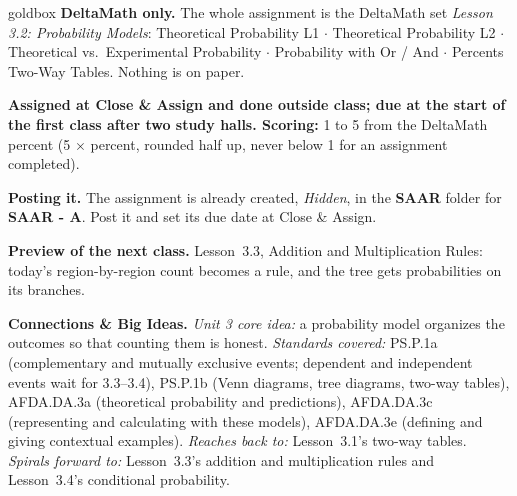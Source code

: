 \documentclass[10pt]{article}
\begin{document}
\boxguard
\begin{skillbox}{goldbox}
\textbf{DeltaMath only.} The whole assignment is the DeltaMath set \emph{Lesson 3.2: Probability
Models}: Theoretical Probability L1 $\cdot$ Theoretical Probability L2 $\cdot$ Theoretical vs.\
Experimental Probability $\cdot$ Probability with Or / And $\cdot$ Percents Two-Way Tables.
Nothing is on paper.

\textbf{Assigned at Close \& Assign and done outside class; due at the start of the first class
after two study halls. Scoring:} 1 to 5 from the DeltaMath percent (5 $\times$ percent, rounded
half up, never below 1 for an assignment completed).

\textbf{Posting it.} The assignment is already created, \emph{Hidden}, in the \textbf{SAAR}
folder for \textbf{SAAR - A}. Post it and set its due date at Close \& Assign.

\textbf{Preview of the next class.} Lesson~3.3, Addition and Multiplication Rules: today's
region-by-region count becomes a rule, and the tree gets probabilities on its branches.

\textbf{Connections \& Big Ideas.} \textit{Unit 3 core idea:} a probability model organizes the
outcomes so that counting them is honest. \textit{Standards covered:} PS.P.1a (complementary and
mutually exclusive events; dependent and independent events wait for 3.3--3.4), PS.P.1b (Venn
diagrams, tree diagrams, two-way tables), AFDA.DA.3a (theoretical probability and predictions),
AFDA.DA.3c (representing and calculating with these models), AFDA.DA.3e (defining and giving
contextual examples). \textit{Reaches back to:} Lesson~3.1's two-way tables. \textit{Spirals
forward to:} Lesson~3.3's addition and multiplication rules and Lesson~3.4's conditional
probability.
\end{skillbox}
\end{document}
